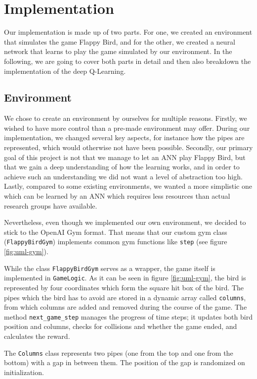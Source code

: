 \section{Implementation}

Our implementation is made up of two parts. For one, we created an environment that simulates the game Flappy Bird, and for the other, we created a neural network that learns to play the game simulated by our environment. In the following, we are going to cover both parts in detail and then also breakdown the implementation of the deep Q-Learning. 

\subsection{Environment}

We chose to create an environment by ourselves for multiple reasons. Firstly, we wished to have more control than a pre-made environment may offer. During our implementation, we changed several key aspects, for instance how the pipes are represented, which would otherwise not have been possible. Secondly, our primary goal of this project is not that we manage to let an ANN play Flappy Bird, but that we gain a deep understanding of how the learning works, and in order to achieve such an understanding we did not want a level of abstraction too high. Lastly, compared to some existing environments, we wanted a more simplistic one which can be learned by an ANN which requires less resources than actual research groups have available.
\par
Nevertheless, even though we implemented our own environment, we decided to stick to the OpenAI Gym format\cite{openaigym}. That means that our custom gym class (\texttt{FlappyBirdGym}) implements common gym functions like \texttt{step} (see figure \ref{fig:uml-gym}).
\par
While the class \texttt{FlappyBirdGym} serves as a wrapper, the game itself is implemented in \texttt{GameLogic}. As it can be seen in figure \ref{fig:uml-gym}, the bird is represented by four coordinates which form the square hit box of the bird. The pipes which the bird has to avoid are stored in a dynamic array called \texttt{columns}, from which columns are added and removed during the course of the game. The method \texttt{next_game_step} manages the progress of time steps; it updates both bird position and columns, checks for collisions and whether the game ended, and calculates the reward. 
\par
The \texttt{Columns} class represents two pipes (one from the top and one from the bottom) with a gap in between them. The position of the gap is randomized on initialization.
\par


